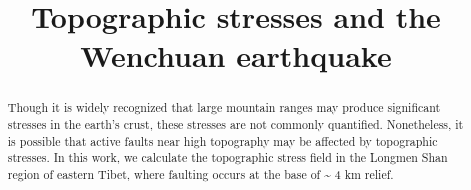 \documentclass[twocolumn,jgrga]{AGUTeX}
\begin{document}
\title{Topographic stresses and the Wenchuan earthquake}



\begin{abstract}
Though it is widely recognized that large mountain ranges may produce
significant stresses in the earth's crust, these stresses are not
commonly quantified. Nonetheless, it is possible that active faults near
high topography may be affected by topographic stresses. In this work,
we calculate the topographic stress field in the Longmen Shan region of
eastern Tibet, where faulting occurs at the base of \textasciitilde{} 4
km relief.
\end{abstract}
\end{document}
